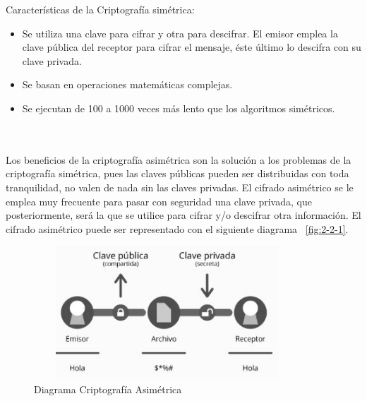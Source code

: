 \bigskip Características de la Criptografía simétrica: \begin{itemize}
	\item Se utiliza una clave para cifrar y otra para descifrar. El emisor emplea la clave pública del receptor para cifrar el mensaje, 	éste último lo descifra con su clave privada.
	\item Se basan en operaciones matemáticas complejas.
	\item Se ejecutan de 100 a 1000 veces más lento que los algoritmos simétricos.
\end{itemize} ~\cite{sime} \\ \\ 

 Los beneficios de la criptografía asimétrica son la solución a los problemas de la criptografía simétrica, pues las claves públicas pueden ser distribuidas con toda tranquilidad, no valen de nada sin las claves privadas. El cifrado asimétrico se le emplea muy frecuente para pasar con seguridad una clave privada, que posteriormente, será la que se utilice para cifrar y/o descifrar otra información. El cifrado asimétrico puede ser representado con el siguiente diagrama ~\ref{fig:2-2-1}.

\begin{figure}[H]
\centering
	\includegraphics[width=10cm, height=5cm]{./images/Cripto_Asimetrica.jpg}
	\caption{Diagrama Criptografía Asimétrica}
	\label{fig:1-2-1}
\end{figure}

